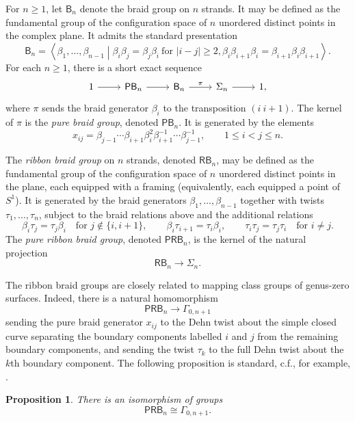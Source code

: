 \documentclass{amsart}
\newcommand{\twist}{\tau}
\newcommand{\Br}{\mathsf{B}} %
\newcommand{\PB}{\mathsf{PB}} %
\newcommand{\RB}{\mathsf{RB}} %
\newcommand{\PRB}{\mathsf{PRB}} %
\newtheorem{prop}[theorem]{Proposition}%
\theoremstyle{definition}
\numberwithin{equation}{section}
\begin{document}
For $n\geq 1$, let $\Br_n$ denote the braid group on $n$ strands. It may be defined as the fundamental group of the configuration space of $n$ unordered distinct points in the complex plane. It admits the standard presentation
\[
\Br_n=
\left\langle
\beta_1,\ldots,\beta_{n-1}
\middle|
\beta_i\beta_j=\beta_j\beta_i \ \text{for } |i-j|\ge 2,
\beta_i\beta_{i+1}\beta_i=\beta_{i+1}\beta_i\beta_{i+1}
\right\rangle .
\]
For each $n\geq 1$, there is a short exact sequence
\[
\begin{tikzcd}
1 \arrow[r] & \PB_n \arrow[r] & \Br_n \arrow[r, "\pi"] & \Sigma_n \arrow[r] & 1,
\end{tikzcd}
\]
where $\pi$ sends the braid generator $\beta_i$ to the transposition $(i\ i+1)$. The kernel of $\pi$ is the \emph{pure braid group}, denoted $\PB_n$. It is generated by the elements
\[
x_{ij}=\beta_{j-1}\cdots \beta_{i+1}\beta_i^2\beta_{i+1}^{-1}\cdots \beta_{j-1}^{-1},
\qquad 1\le i<j\le n.
\]

The \emph{ribbon braid group} on $n$ strands, denoted $\RB_n$, may be defined as the fundamental group of the configuration space of $n$ unordered distinct points in the plane, each equipped with a framing (equivalently, each equipped a point of $S^1$). It is generated by the braid generators $\beta_1,\ldots,\beta_{n-1}$ together with twists $\twist_1,\ldots,\twist_n$, subject to the braid relations above and the additional relations
\[
\beta_i\twist_j=\twist_j\beta_i \quad \text{for } j\notin\{i,i+1\},\qquad
\beta_i\twist_{i+1}=\twist_i\beta_i,\qquad
\twist_i\twist_j=\twist_j\twist_i \quad \text{for } i\neq j.
\]
The \emph{pure ribbon braid group}, denoted $\PRB_n$, is the kernel of the natural projection
\[
\RB_n\longrightarrow \Sigma_n.
\]

The ribbon braid groups are closely related to mapping class groups of genus-zero surfaces. Indeed, there is a natural homomorphism
\[
\PRB_n\longrightarrow \Gamma_{0,n+1}
\]
sending the pure braid generator $x_{ij}$ to the Dehn twist about the simple closed curve separating the boundary components labelled $i$ and $j$ from the remaining boundary components, and sending the twist $\twist_k$ to the full Dehn twist about the $k$th boundary component. The following proposition is standard, c.f., for example, \cite[Section 1.5]{Wahl_Thesis}. 

\begin{prop}\label{prop: RBn is Gamma0n+1}
There is an isomorphism of groups
\[
\PRB_n\cong \Gamma_{0,n+1}.
\]
\end{prop}
\end{document}
